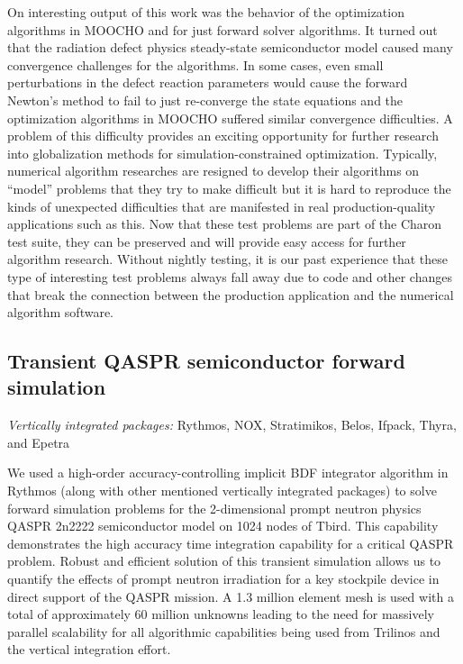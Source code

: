 \documentclass[pdf,ps2pdf,11pt]{SANDreport}
\begin{document}

On interesting output of this work was the behavior of the optimization
algorithms in MOOCHO and for just forward solver algorithms.  It turned out
that the radiation defect physics steady-state semiconductor model caused many
convergence challenges for the algorithms.  In some cases, even small
perturbations in the defect reaction parameters would cause the forward
Newton's method to fail to just re-converge the state equations and the
optimization algorithms in MOOCHO suffered similar convergence difficulties.
A problem of this difficulty provides an exciting opportunity for further
research into globalization methods for simulation-constrained optimization.
Typically, numerical algorithm researches are resigned to develop their
algorithms on ``model'' problems that they try to make difficult but it is
hard to reproduce the kinds of unexpected difficulties that are manifested in
real production-quality applications such as this.  Now that these test
problems are part of the Charon test suite, they can be preserved and will
provide easy access for further algorithm research.  Without nightly testing,
it is our past experience that these type of interesting test problems always
fall away due to code and other changes that break the connection between the
production application and the numerical algorithm software.


%
\subsection{Transient QASPR semiconductor forward simulation}
%

{}\noindent\textit{Vertically integrated packages:} Rythmos, NOX, Stratimikos,
Belos, Ifpack, Thyra, and Epetra

We used a high-order accuracy-controlling implicit BDF integrator algorithm in
Rythmos (along with other mentioned vertically integrated packages) to solve
forward simulation problems for the 2-dimensional prompt neutron physics
QASPR 2n2222 semiconductor model on 1024 nodes of Tbird.  This capability
demonstrates the high accuracy time integration capability for a critical
QASPR problem.  Robust and efficient solution of this transient simulation
allows us to quantify the effects of prompt neutron irradiation for a key
stockpile device in direct support of the QASPR mission.  A 1.3 million element
mesh is used with a total of approximately 60 million unknowns leading to
the need for massively parallel scalability for all algorithmic capabilities
being used from Trilinos and the vertical integration effort. 
\end{document}
